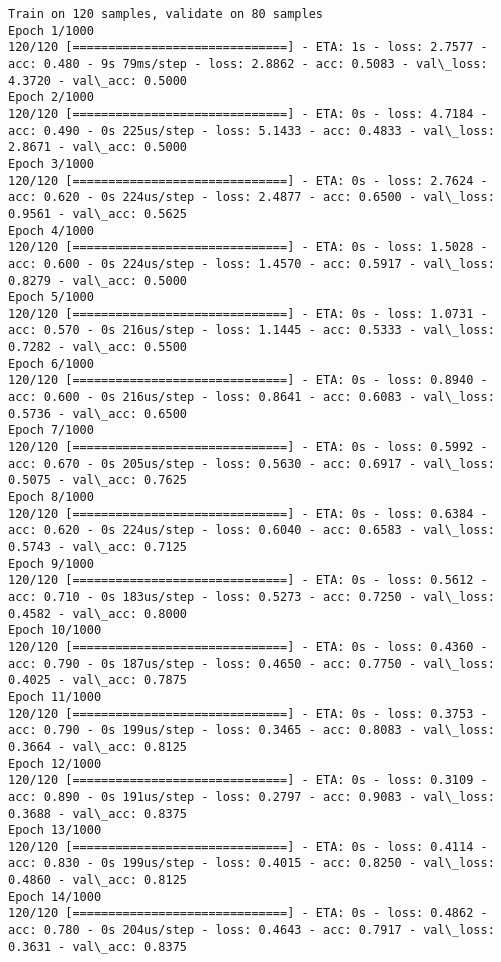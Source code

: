 \documentclass[11pt]{article}
\begin{document}
    \begin{Verbatim}[commandchars=\\\{\}]
Train on 120 samples, validate on 80 samples
Epoch 1/1000
120/120 [==============================] - ETA: 1s - loss: 2.7577 - acc: 0.480 - 9s 79ms/step - loss: 2.8862 - acc: 0.5083 - val\_loss: 4.3720 - val\_acc: 0.5000
Epoch 2/1000
120/120 [==============================] - ETA: 0s - loss: 4.7184 - acc: 0.490 - 0s 225us/step - loss: 5.1433 - acc: 0.4833 - val\_loss: 2.8671 - val\_acc: 0.5000
Epoch 3/1000
120/120 [==============================] - ETA: 0s - loss: 2.7624 - acc: 0.620 - 0s 224us/step - loss: 2.4877 - acc: 0.6500 - val\_loss: 0.9561 - val\_acc: 0.5625
Epoch 4/1000
120/120 [==============================] - ETA: 0s - loss: 1.5028 - acc: 0.600 - 0s 224us/step - loss: 1.4570 - acc: 0.5917 - val\_loss: 0.8279 - val\_acc: 0.5000
Epoch 5/1000
120/120 [==============================] - ETA: 0s - loss: 1.0731 - acc: 0.570 - 0s 216us/step - loss: 1.1445 - acc: 0.5333 - val\_loss: 0.7282 - val\_acc: 0.5500
Epoch 6/1000
120/120 [==============================] - ETA: 0s - loss: 0.8940 - acc: 0.600 - 0s 216us/step - loss: 0.8641 - acc: 0.6083 - val\_loss: 0.5736 - val\_acc: 0.6500
Epoch 7/1000
120/120 [==============================] - ETA: 0s - loss: 0.5992 - acc: 0.670 - 0s 205us/step - loss: 0.5630 - acc: 0.6917 - val\_loss: 0.5075 - val\_acc: 0.7625
Epoch 8/1000
120/120 [==============================] - ETA: 0s - loss: 0.6384 - acc: 0.620 - 0s 224us/step - loss: 0.6040 - acc: 0.6583 - val\_loss: 0.5743 - val\_acc: 0.7125
Epoch 9/1000
120/120 [==============================] - ETA: 0s - loss: 0.5612 - acc: 0.710 - 0s 183us/step - loss: 0.5273 - acc: 0.7250 - val\_loss: 0.4582 - val\_acc: 0.8000
Epoch 10/1000
120/120 [==============================] - ETA: 0s - loss: 0.4360 - acc: 0.790 - 0s 187us/step - loss: 0.4650 - acc: 0.7750 - val\_loss: 0.4025 - val\_acc: 0.7875
Epoch 11/1000
120/120 [==============================] - ETA: 0s - loss: 0.3753 - acc: 0.790 - 0s 199us/step - loss: 0.3465 - acc: 0.8083 - val\_loss: 0.3664 - val\_acc: 0.8125
Epoch 12/1000
120/120 [==============================] - ETA: 0s - loss: 0.3109 - acc: 0.890 - 0s 191us/step - loss: 0.2797 - acc: 0.9083 - val\_loss: 0.3688 - val\_acc: 0.8375
Epoch 13/1000
120/120 [==============================] - ETA: 0s - loss: 0.4114 - acc: 0.830 - 0s 199us/step - loss: 0.4015 - acc: 0.8250 - val\_loss: 0.4860 - val\_acc: 0.8125
Epoch 14/1000
120/120 [==============================] - ETA: 0s - loss: 0.4862 - acc: 0.780 - 0s 204us/step - loss: 0.4643 - acc: 0.7917 - val\_loss: 0.3631 - val\_acc: 0.8375

\end{Verbatim}
\end{document}
